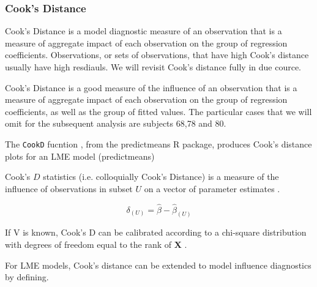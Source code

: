 \documentclass[12pt, a4paper]{report}
\theoremstyle{plain}
\theoremstyle{definition}
\theoremstyle{remark}
\begin{document}
	
	
	
	
	\subsubsection{Cook's Distance}%
	
		Cook's Distance is a model diagnostic measure of an observation that is a measure of aggregate impact of each observation on the group of regression coefficients. Observations, or sets of observations, that have high Cook's distance usually have high resdiauls. We will revisit Cook's distance fully in due cource.
		
		Cook's Distance is a good measure of the influence of an observation that is a measure of aggregate impact of each observation on the group of regression coefficients, as well as the group of fitted values.
		The particular cases that we will omit for the subsequent analysis are subjects 68,78 and 80.

		
		The \texttt{CookD} fucntion , from the predictmeans R package, produces Cook’s distance plots for an LME model 
		(predictmeans)
		
		
		
		

	 Cook's $D$ statistics (i.e. colloquially Cook's Distance) is a measure of the influence of observations in subset $U$ on a vector of parameter estimates \citep{cook77}.
	
	\[ \delta_{(U)} = \hat{\beta} - \hat{\beta}_{(U)}\]
	
	If V is known, Cook's D can be calibrated according to a chi-square distribution with degrees of freedom equal to the rank of $\boldsymbol{X}$ \citep{cpj92}.
	
	
	For LME models, Cook's distance can be extended to model influence diagnostics by defining.
	
\end{document}
